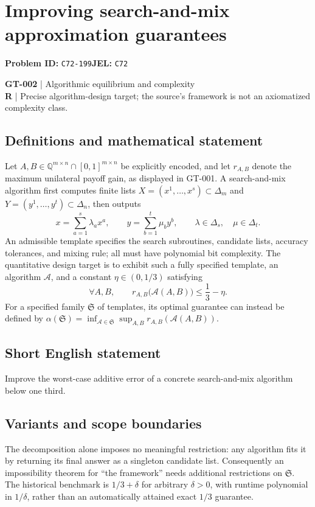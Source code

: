 \documentclass[11pt,a4paper]{article}
\begin{document}
\section*{Improving search-and-mix approximation guarantees}
\textbf{Problem ID:} \texttt{C72-199}\quad \textbf{JEL:} \texttt{C72}\par
\label{problem:OP-0132}
\label{game:GT-002}
{\sffamily\small\color{muted}
\textbf{GT-002} | Algorithmic equilibrium and complexity\\
\textbf{R} | Precise algorithm-design target; the source's framework is not an axiomatized complexity class.
\par}
\subsection*{Definitions and mathematical statement}
Let $A,B\in\mathbb Q^{m\times n}\cap[0,1]^{m\times n}$ be explicitly encoded, and let $r_{A,B}$ denote the maximum unilateral payoff gain, as displayed in GT-001. A search-and-mix algorithm first computes finite lists $X=(x^1,\ldots,x^s)\subset\Delta_m$ and $Y=(y^1,\ldots,y^t)\subset\Delta_n$, then outputs
\[
 x=\sum_{a=1}^{s}\lambda_ax^a,\qquad
 y=\sum_{b=1}^{t}\mu_by^b,\qquad
 \lambda\in\Delta_s,\quad\mu\in\Delta_t.
\]
An admissible template specifies the search subroutines, candidate lists, accuracy tolerances, and mixing rule; all must have polynomial bit complexity. The quantitative design target is to exhibit such a fully specified template, an algorithm $\mathcal A$, and a constant $\eta\in(0,1/3)$ satisfying
\[
 \forall A,B,\qquad
 r_{A,B}\bigl(\mathcal A(A,B)\bigr)\leq \frac13-\eta.
\]
For a specified family $\mathfrak S$ of templates, its optimal guarantee can instead be defined by $\alpha(\mathfrak S)=\inf_{\mathcal A\in\mathfrak S}\sup_{A,B}r_{A,B}(\mathcal A(A,B))$.
\subsection*{Short English statement}
Improve the worst-case additive error of a concrete search-and-mix algorithm below one third.
\subsection*{Variants and scope boundaries}
The decomposition alone imposes no meaningful restriction: any algorithm fits it by returning its final answer as a singleton candidate list. Consequently an impossibility theorem for ``the framework'' needs additional restrictions on $\mathfrak S$. The historical benchmark is $1/3+\delta$ for arbitrary $\delta>0$, with runtime polynomial in $1/\delta$, rather than an automatically attained exact $1/3$ guarantee.
\end{document}
